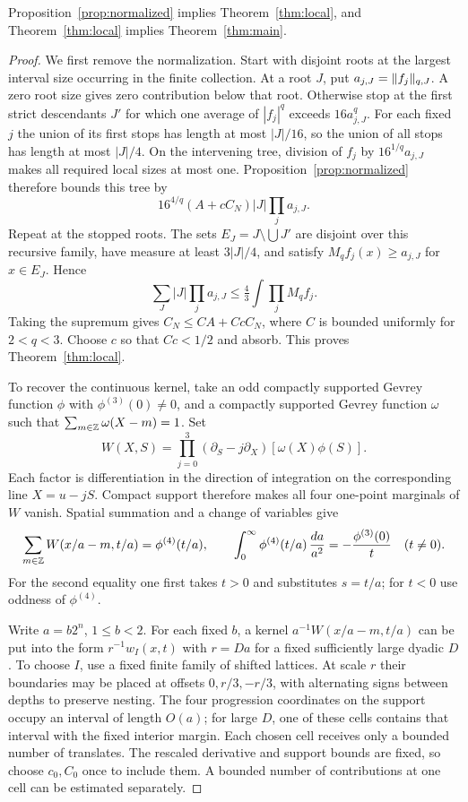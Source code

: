 \begin{lemma}\label{lem:outer}
Proposition~\ref{prop:normalized} implies Theorem~\ref{thm:local},
and Theorem~\ref{thm:local} implies Theorem~\ref{thm:main}.
\end{lemma}
\begin{proof}
We first remove the normalization.  Start with disjoint roots at the
largest interval size occurring in the finite collection.  At a root
$J$, put $a_{j,J}=\lVert f_j\rVert_{q,J}$.  A zero root size gives zero
contribution below that root.  Otherwise stop at the first strict
descendants $J'$ for which one average of $|f_j|^q$ exceeds
$16a_{j,J}^q$.  For each fixed $j$ the union of its first stops has length
at most $|J|/16$, so the union of all stops has length at most $|J|/4$.
On the intervening tree, division of $f_j$ by $16^{1/q}a_{j,J}$ makes
all required local sizes at most one.  Proposition~\ref{prop:normalized}
therefore bounds this tree by
\[
 16^{4/q}(A+cC_N)|J|\prod_ja_{j,J}.
\]
Repeat at the stopped roots.  The sets
$E_J=J\setminus\bigcup J'$ are disjoint over this recursive family,
have measure at least $3|J|/4$, and satisfy
$M_qf_j(x)\ge a_{j,J}$ for $x\in E_J$.  Hence
\[
 \sum_J |J|\prod_ja_{j,J}
 \le\tfrac43\int\prod_jM_qf_j.
\]
Taking the supremum gives
$C_N\le C A+C cC_N$, where $C$ is bounded uniformly for $2<q<3$.
Choose $c$ so that $Cc<1/2$ and absorb.  This proves
Theorem~\ref{thm:local}.

To recover the continuous kernel, take an odd compactly supported
Gevrey function $\phi$ with $\phi^{(3)}(0)\ne0$, and a compactly
supported Gevrey function $\omega$ such that
$\sum_{m\in\mathbb Z}\omega(X-m)=1$.  Set
\[
 W(X,S)=\prod_{j=0}^3(\partial_S-j\partial_X)
                 [\omega(X)\phi(S)].
\]
Each factor is differentiation in the direction of integration on the
corresponding line $X=u-jS$.  Compact support therefore makes all four
one-point marginals of $W$ vanish.  Spatial summation and a change of
variables give
\[
 \sum_{m\in\mathbb Z}W(x/a-m,t/a)=\phi^{(4)}(t/a),\qquad
 \int_0^\infty\phi^{(4)}(t/a)\,\frac{da}{a^2}
 =-\frac{\phi^{(3)}(0)}{t}\quad(t\ne0).
\]
For the second equality one first takes $t>0$ and substitutes $s=t/a$;
for $t<0$ use oddness of $\phi^{(4)}$.

Write $a=b2^n$, $1\le b<2$.  For each fixed $b$, a kernel
$a^{-1}W(x/a-m,t/a)$ can be put into the form $r^{-1}w_I(x,t)$ with
$r=Da$ for a fixed sufficiently large dyadic $D$.  To choose $I$, use
a fixed finite family of shifted lattices.  At scale $r$ their
boundaries may be placed at offsets $0,r/3,-r/3$, with alternating signs
between depths to preserve nesting.  The four progression coordinates
on the support occupy an interval of length $O(a)$; for large $D$, one
of these cells contains that interval with the fixed interior margin.
Each chosen cell receives only a bounded number of translates.  The
rescaled derivative and support bounds are fixed, so choose $c_0,C_0$
once to include them.  A bounded number of contributions at one cell
can be estimated separately.


\end{proof}
